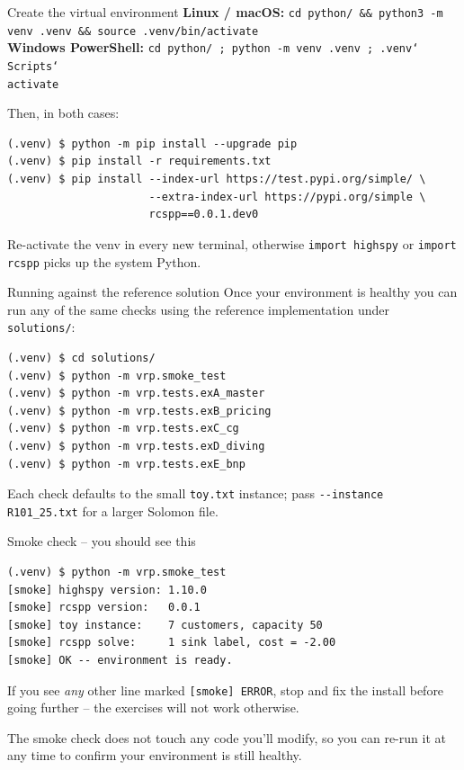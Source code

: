 \documentclass[10pt,aspectratio=169]{beamer}
\begin{document}
\begin{frame}[fragile]{Create the virtual environment}
  \textbf{Linux / macOS:}\hspace{1em}
  \texttt{\scriptsize cd python/ \&\& python3 -m venv .venv \&\&
  source .venv/bin/activate}\\[2pt]
  \textbf{Windows PowerShell:}\hspace{1em}
  \texttt{\scriptsize cd python/ ; python -m venv .venv ;
  .venv\char`\\Scripts\char`\\activate}

  \medskip
  Then, in both cases:
\begin{lstlisting}[style=sh,basicstyle=\ttfamily\scriptsize]
(.venv) $ python -m pip install --upgrade pip
(.venv) $ pip install -r requirements.txt
(.venv) $ pip install --index-url https://test.pypi.org/simple/ \
                      --extra-index-url https://pypi.org/simple \
                      rcspp==0.0.1.dev0
\end{lstlisting}
  \begin{warnbox}
    Re-activate the venv in every new terminal, otherwise
    \texttt{import highspy} or \texttt{import rcspp} picks up the system
    Python.
  \end{warnbox}
\end{frame}

\begin{frame}[fragile]{Running against the reference solution}
  Once your environment is healthy you can run any of the same checks
  using the reference implementation under \texttt{solutions/}:
\begin{lstlisting}[style=sh,basicstyle=\ttfamily\scriptsize]
(.venv) $ cd solutions/
(.venv) $ python -m vrp.smoke_test
(.venv) $ python -m vrp.tests.exA_master
(.venv) $ python -m vrp.tests.exB_pricing
(.venv) $ python -m vrp.tests.exC_cg
(.venv) $ python -m vrp.tests.exD_diving
(.venv) $ python -m vrp.tests.exE_bnp
\end{lstlisting}
  Each check defaults to the small \texttt{toy.txt} instance; pass
  \texttt{{-}{-}instance R101\_25.txt} for a larger Solomon file.
\end{frame}

\begin{frame}[fragile]{Smoke check -- you should see this}
\begin{lstlisting}[style=sh]
(.venv) $ python -m vrp.smoke_test
[smoke] highspy version: 1.10.0
[smoke] rcspp version:   0.0.1
[smoke] toy instance:    7 customers, capacity 50
[smoke] rcspp solve:     1 sink label, cost = -2.00
[smoke] OK -- environment is ready.
\end{lstlisting}
  If you see \emph{any} other line marked \texttt{[smoke] ERROR}, stop and
  fix the install before going further -- the exercises will not work
  otherwise.
  \medskip
  \begin{tipbox}
    The smoke check does not touch any code you'll modify, so you can
    re-run it at any time to confirm your environment is still healthy.
  \end{tipbox}
\end{frame}
\end{document}
